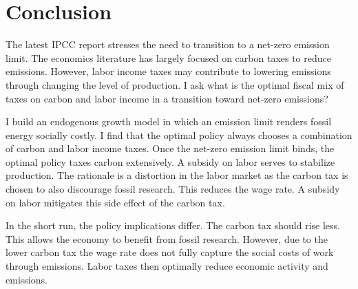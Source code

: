\section{Conclusion}\label{sec:con}

The latest IPCC report \citep{IPCC2022} stresses the need to transition to a net-zero emission limit. The economics literature has largely focused on carbon taxes to reduce emissions. However, labor income taxes may contribute to lowering emissions through changing the level of production. I ask what is the optimal fiscal mix of taxes on carbon and labor income in a transition toward net-zero emissions?


 I build an endogenous growth model in which an emission limit renders fossil energy socially costly. I find that the optimal policy always chooses a combination of carbon and labor income taxes. Once the net-zero emission limit binds, the optimal policy taxes carbon extensively. A subsidy on labor serves to stabilize production.
 The rationale is a distortion in the labor market as the carbon tax is chosen to also discourage fossil research. This reduces the wage rate.  A subsidy on labor mitigates this side effect of the carbon tax.
 
  In the short run, the policy implications differ.  
  The carbon tax should rise less. This allows the economy to benefit from fossil research. However, due to the lower carbon tax the wage rate does not fully capture the social costs of work through emissions. Labor taxes then optimally reduce economic activity and emissions.
  
